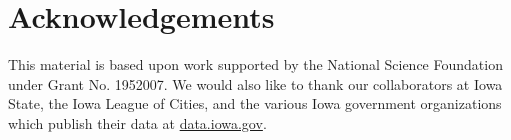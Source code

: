\documentclass[10pt]{article}\usepackage[]{graphicx}\usepackage[]{color}
\begin{document}


\section{Acknowledgements}
This material is based upon work supported by the National Science Foundation under Grant No. 1952007. We would also like to thank our collaborators at Iowa State, the Iowa League of Cities, and the various Iowa government organizations which publish their data at \url{data.iowa.gov}.



\end{document}
